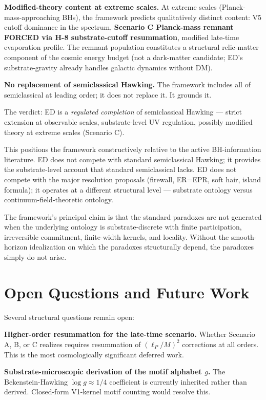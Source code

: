 \documentclass[11pt,a4paper]{article}
\begin{document}
\textbf{Modified-theory content at extreme scales.} At extreme scales (Planck-mass-approaching BHs), the framework predicts qualitatively distinct content: V5 cutoff dominance in the spectrum, \textbf{Scenario C Planck-mass remnant FORCED via H-8 substrate-cutoff resummation}, modified late-time evaporation profile. The remnant population constitutes a structural relic-matter component of the cosmic energy budget (not a dark-matter candidate; ED's substrate-gravity already handles galactic dynamics without DM).

\textbf{No replacement of semiclassical Hawking.} The framework includes all of semiclassical at leading order; it does not replace it. It grounds it.

The verdict: ED is a \emph{regulated completion} of semiclassical Hawking --- strict extension at observable scales, substrate-level UV regulation, possibly modified theory at extreme scales (Scenario C).

This positions the framework constructively relative to the active BH-information literature. ED does not compete with standard semiclassical Hawking; it provides the substrate-level account that standard semiclassical lacks. ED does not compete with the major resolution proposals (firewall, ER=EPR, soft hair, island formula); it operates at a different structural level --- substrate ontology versus continuum-field-theoretic ontology.

The framework's principal claim is that the standard paradoxes are not generated when the underlying ontology is substrate-discrete with finite participation, irreversible commitment, finite-width kernels, and locality. Without the smooth-horizon idealization on which the paradoxes structurally depend, the paradoxes simply do not arise.

\section{Open Questions and Future Work}

Several structural questions remain open:

\textbf{Higher-order resummation for the late-time scenario.} Whether Scenario A, B, or C realizes requires resummation of $(\ell_P/M)^2$ corrections at all orders. This is the most cosmologically significant deferred work.

\textbf{Substrate-microscopic derivation of the motif alphabet $g$.} The Bekenstein-Hawking $\log g \approx 1/4$ coefficient is currently inherited rather than derived. Closed-form V1-kernel motif counting would resolve this.
\end{document}
